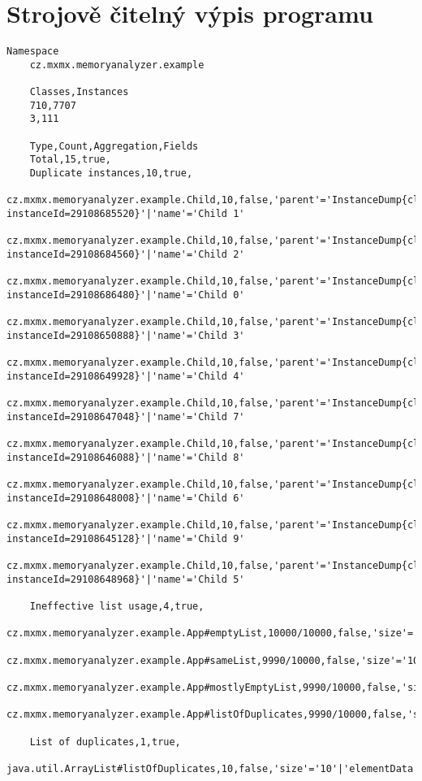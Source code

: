 \chapter{Strojově čitelný výpis programu}
\label{runtime-log-csv}
\begin{minipage}{\linewidth}
\begin{lstlisting}[basicstyle=\tiny,columns=fullflexible,frame=single,breaklines=true,postbreak=\mbox{\textcolor{red}{$\hookrightarrow$}\space}]
    Namespace 
    cz.mxmx.memoryanalyzer.example
    
    Classes,Instances
    710,7707
    3,111
    
    Type,Count,Aggregation,Fields
    Total,15,true,
    Duplicate instances,10,true,
    cz.mxmx.memoryanalyzer.example.Child,10,false,'parent'='InstanceDump{classDump=cz.mxmx.memoryanalyzer.example.Parent, instanceId=29108685520}'|'name'='Child 1'
    cz.mxmx.memoryanalyzer.example.Child,10,false,'parent'='InstanceDump{classDump=cz.mxmx.memoryanalyzer.example.Parent, instanceId=29108684560}'|'name'='Child 2'
    cz.mxmx.memoryanalyzer.example.Child,10,false,'parent'='InstanceDump{classDump=cz.mxmx.memoryanalyzer.example.Parent, instanceId=29108686480}'|'name'='Child 0'
    cz.mxmx.memoryanalyzer.example.Child,10,false,'parent'='InstanceDump{classDump=cz.mxmx.memoryanalyzer.example.Parent, instanceId=29108650888}'|'name'='Child 3'
    cz.mxmx.memoryanalyzer.example.Child,10,false,'parent'='InstanceDump{classDump=cz.mxmx.memoryanalyzer.example.Parent, instanceId=29108649928}'|'name'='Child 4'
    cz.mxmx.memoryanalyzer.example.Child,10,false,'parent'='InstanceDump{classDump=cz.mxmx.memoryanalyzer.example.Parent, instanceId=29108647048}'|'name'='Child 7'
    cz.mxmx.memoryanalyzer.example.Child,10,false,'parent'='InstanceDump{classDump=cz.mxmx.memoryanalyzer.example.Parent, instanceId=29108646088}'|'name'='Child 8'
    cz.mxmx.memoryanalyzer.example.Child,10,false,'parent'='InstanceDump{classDump=cz.mxmx.memoryanalyzer.example.Parent, instanceId=29108648008}'|'name'='Child 6'
    cz.mxmx.memoryanalyzer.example.Child,10,false,'parent'='InstanceDump{classDump=cz.mxmx.memoryanalyzer.example.Parent, instanceId=29108645128}'|'name'='Child 9'
    cz.mxmx.memoryanalyzer.example.Child,10,false,'parent'='InstanceDump{classDump=cz.mxmx.memoryanalyzer.example.Parent, instanceId=29108648968}'|'name'='Child 5'
    
    Ineffective list usage,4,true,
    cz.mxmx.memoryanalyzer.example.App#emptyList,10000/10000,false,'size'='0'|'elementData'='29108787560'
    cz.mxmx.memoryanalyzer.example.App#sameList,9990/10000,false,'size'='10'|'elementData'='29108717000'
    cz.mxmx.memoryanalyzer.example.App#mostlyEmptyList,9990/10000,false,'size'='10'|'elementData'='29108860312'
    cz.mxmx.memoryanalyzer.example.App#listOfDuplicates,9990/10000,false,'size'='10'|'elementData'='29108997736'
    
    List of duplicates,1,true,
    java.util.ArrayList#listOfDuplicates,10,false,'size'='10'|'elementData'='29108997736'    
\end{lstlisting}
\end{minipage}